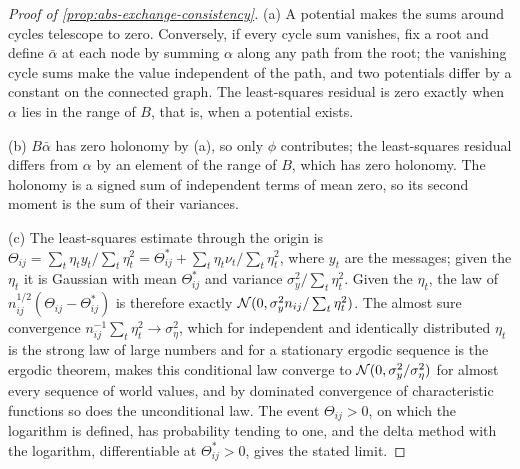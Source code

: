 \begin{proof}[Proof of \cref{prop:abs-exchange-consistency}]
(a) A potential makes the sums around cycles telescope to zero. Conversely, if every cycle sum vanishes, fix a root and define $\bar\alpha$ at each node by summing $\alpha$ along any path from the root; the vanishing cycle sums make the value independent of the path, and two potentials differ by a constant on the connected graph. The least-squares residual is zero exactly when $\alpha$ lies in the range of $B$, that is, when a potential exists.

(b) $B\bar\alpha$ has zero holonomy by (a), so only $\phi$ contributes; the least-squares residual differs from $\alpha$ by an element of the range of $B$, which has zero holonomy. The holonomy is a signed sum of independent terms of mean zero, so its second moment is the sum of their variances.

(c) The least-squares estimate through the origin is $\Theta_{ij}=\sum_t\eta_ty_t/\sum_t\eta_t^2=\Theta^\ast_{ij}+\sum_t\eta_t\nu_t/\sum_t\eta_t^2$, where $y_t$ are the messages; given the $\eta_t$ it is Gaussian with mean $\Theta^\ast_{ij}$ and variance $\sigma_y^2/\sum_t\eta_t^2$. Given the $\eta_t$, the law of $n_{ij}^{1/2}(\Theta_{ij}-\Theta^\ast_{ij})$ is therefore exactly $\mathcal{N}(0,\sigma_y^2n_{ij}/\sum_t\eta_t^2)$. The almost sure convergence $n_{ij}^{-1}\sum_t\eta_t^2\to\sigma_\eta^2$, which for independent and identically distributed $\eta_t$ is the strong law of large numbers and for a stationary ergodic sequence is the ergodic theorem, makes this conditional law converge to $\mathcal{N}(0,\sigma_y^2/\sigma_\eta^2)$ for almost every sequence of world values, and by dominated convergence of characteristic functions so does the unconditional law. The event $\Theta_{ij}>0$, on which the logarithm is defined, has probability tending to one, and the delta method with the logarithm, differentiable at $\Theta^\ast_{ij}>0$, gives the stated limit.
\end{proof}

